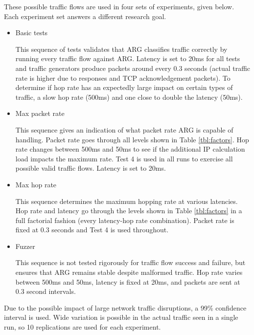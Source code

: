 
\par These possible traffic flows are used in four sets of experiments, given below. Each experiment set answers a different research goal.
\begin{itemize}
	\item Basic tests
	\par This sequence of tests validates that \ac{ARG} classifies traffic correctly by running every traffic flow against \ac{ARG}. Latency is set to 20ms for all tests and traffic generators produce packets around every 0.3 seconds (actual traffic rate is higher due to responses and \ac{TCP} acknowledgement packets). To determine if hop rate has an expectedly large impact on certain types of traffic, a slow hop rate (500ms) and one close to double the latency (50ms).

	\item Max packet rate
	\par This sequence gives an indication of what packet rate \ac{ARG} is capable of handling. Packet rate goes through all levels shown in Table \ref{tbl:factors}. Hop rate changes between 500ms and 50ms to see if the additional \ac{IP} calculation load impacts the maximum rate. Test 4  is used in all runs to exercise all possible valid traffic flows. Latency is set to 20ms.

	\item Max hop rate
	\par This sequence determines the maximum hopping rate at various latencies. Hop rate and latency go through the levels shown in Table \ref{tbl:factors} in a full factorial fashion (every latency-hop rate combination). Packet rate is fixed at 0.3 seconds and Test 4 is used throughout.

	\item Fuzzer
	\par This sequence is not tested rigorously for traffic flow success and failure, but ensures that \ac{ARG} remains stable despite malformed traffic. Hop rate varies between 500ms and 50ms, latency is fixed at 20ms, and packets are sent at 0.3 second intervals.
\end{itemize}

\par Due to the possible impact of large network traffic disruptions, a 99\% confidence interval is used. Wide variation is possible in the actual traffic seen in a single run, so 10 replications are used for each experiment.

